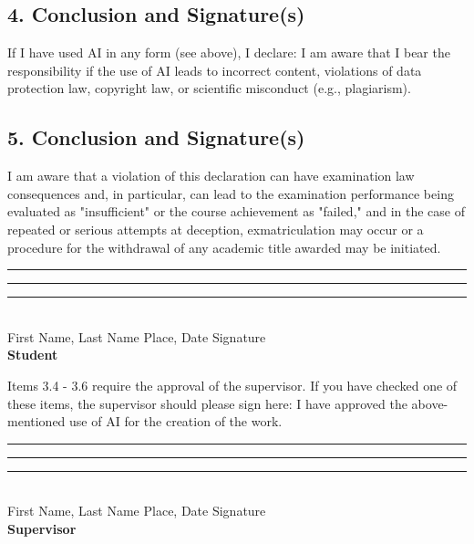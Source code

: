 {        \subsection*{4. Conclusion and Signature(s)}
        If I have used AI in any form (see above), I declare:
        I am aware that I bear the responsibility if the use of AI leads to incorrect content, violations of data protection law, copyright law, or scientific misconduct (e.g., plagiarism).

        \subsection*{5. Conclusion and Signature(s)}
        I am aware that a violation of this declaration can have examination law consequences and, in particular, can lead to the examination performance being evaluated as "insufficient" or the course achievement as "failed," and in the case of repeated or serious attempts at deception, exmatriculation may occur or a procedure for the withdrawal of any academic title awarded may be initiated.

        \vspace{1.5cm}
        \noindent
        \rule{5cm}{0.4pt} \hfill \rule{4cm}{0.4pt} \hfill \rule{5cm}{0.4pt} \\
        First Name, Last Name \hfill Place, Date \hfill Signature \\
        \textbf{Student}

        \vspace{1cm}
        \noindent
        Items 3.4 - 3.6 require the approval of the supervisor. If you have checked one of these items, the supervisor should please sign here:
        I have approved the above-mentioned use of AI for the creation of the work.

        \vspace{1.5cm}
        \noindent
        \rule{5cm}{0.4pt} \hfill \rule{4cm}{0.4pt} \hfill \rule{5cm}{0.4pt} \\
        First Name, Last Name \hfill Place, Date \hfill Signature \\
        \textbf{Supervisor}
    \fi
    \clearpage
}
